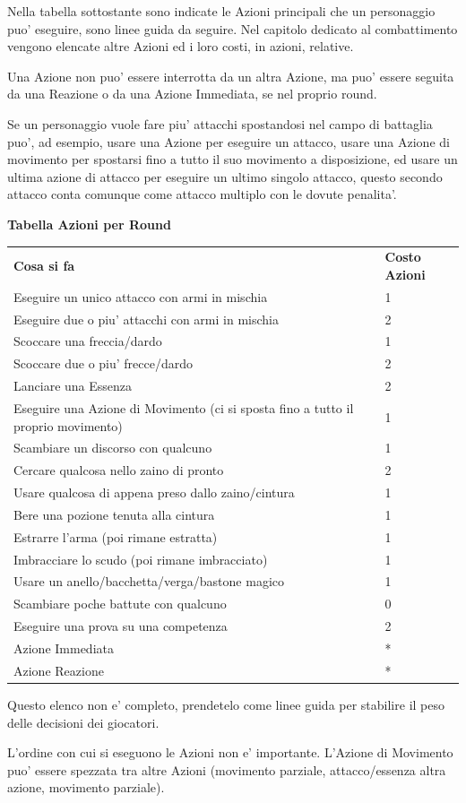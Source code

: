 \documentclass[a4paper,11pt,twoside,openany]{book}
\begin{document}
Nella tabella sottostante sono indicate le Azioni principali che un personaggio puo' eseguire, sono linee guida da seguire. Nel capitolo dedicato al combattimento vengono elencate altre Azioni ed i loro costi, in azioni, relative.

Una Azione non puo' essere interrotta da un altra Azione, ma puo' essere seguita da una Reazione o da una Azione Immediata, se nel proprio round.

Se un personaggio vuole fare piu' attacchi spostandosi nel campo di battaglia puo', ad esempio, usare una Azione per eseguire un attacco, usare una Azione di movimento per spostarsi fino a tutto il suo movimento a disposizione, ed usare un ultima azione di attacco per eseguire un ultimo singolo attacco, questo secondo attacco conta comunque come attacco multiplo con le dovute penalita'.

\medskip

\textbf{Tabella Azioni per Round}

\medskip

\begin{tabular}{ll}
\toprule
\textbf{Cosa si fa} & \textbf{Costo Azioni}\tabularnewline
Eseguire un unico attacco con armi in mischia & 1\tabularnewline
Eseguire due o piu' attacchi con armi in mischia & 2\tabularnewline
Scoccare una freccia/dardo & 1\tabularnewline
Scoccare due o piu' frecce/dardo & 2\tabularnewline
Lanciare una Essenza & 2\tabularnewline
Eseguire una Azione di Movimento (ci si sposta fino a tutto
il proprio movimento) & 1\tabularnewline
Scambiare un discorso con qualcuno & 1\tabularnewline
Cercare qualcosa nello zaino di pronto & 2\tabularnewline
Usare qualcosa di appena preso dallo zaino/cintura & 1\tabularnewline
Bere una pozione tenuta alla cintura & 1\tabularnewline
Estrarre l'arma (poi rimane estratta) & 1\tabularnewline
Imbracciare lo scudo (poi rimane imbracciato) & 1\tabularnewline
Usare un anello/bacchetta/verga/bastone magico & 1\tabularnewline
Scambiare poche battute con qualcuno & 0\tabularnewline
Eseguire una prova su una competenza & 2\tabularnewline
Azione Immediata & {*}\tabularnewline
Azione Reazione & {*}\tabularnewline

\end{tabular}

\smallskip

Questo elenco non e' completo, prendetelo come linee guida per stabilire il peso delle decisioni dei giocatori.

\bigskip

L'ordine con cui si eseguono le Azioni non e' importante. L'Azione di Movimento puo' essere spezzata tra altre Azioni (movimento parziale, attacco/essenza altra azione, movimento parziale).
\end{document}
